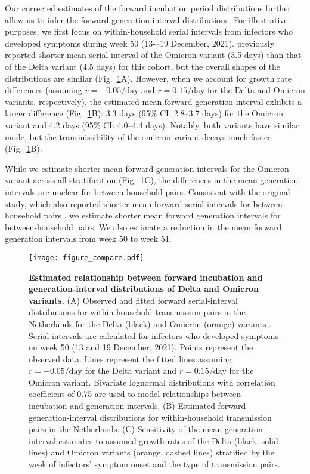 \documentclass[12pt]{article}
\newcommand{\fref}[1]{Fig.~\ref{fig:#1}}
\begin{document}
Our corrected estimates of the forward incubation period distributions further allow us to infer the forward generation-interval distributions.
For illustrative purposes, we first focus on within-household serial intervals from infectors who developed symptoms during week 50 (13-–19 December, 2021).
\citep{backer2021omicron} previously reported shorter mean serial interval of the Omicron variant (3.5 days) than that of the Delta variant (4.5 days) for this cohort, but the overall shapes of the distributions are similar (\fref{serial}A).
However, when we account for growth rate differences (assuming $r=-0.05/\mathrm{day}$ and $r=0.15/\mathrm{day}$ for the Delta and Omicron variants, respectively), the estimated mean forward generation interval exhibits a larger difference (\fref{serial}B): 3.3 days (95\% CI: 2.8--3.7 days) for the Omicron variant and 4.2 days (95\% CI: 4.0--4.4 days).
Notably, both variants have similar mode, but the transmissibility of the omicron variant decays much faster (\fref{serial}B).

While we estimate shorter mean forward generation intervals for the Omicron variant across all stratification (\fref{serial}C), the differences in the mean generation intervals are unclear for between-household pairs.
Consistent with the original study, which also reported shorter mean forward serial intervals for between-household pairs \citep{backer2021omicron}, we estimate shorter mean forward generation intervals for between-household pairs.
We also estimate a reduction in the mean forward generation intervals from week 50 to week 51. 

\begin{figure}[!th]
\texttt{[image: figure\_compare.pdf]}
\caption{
\textbf{Estimated relationship between forward incubation and generation-interval distributions of Delta and Omicron variants.}
(A) Observed and fitted forward serial-interval distributions for within-household transmission pairs in the Netherlands for the Delta (black) and Omicron (orange) variants \citep{backer2021omicron}.
Serial intervals are calculated for infectors who developed symptoms on week 50 (13 and 19 December, 2021).
Points represent the observed data.
Lines represent the fitted lines assuming $r=-0.05/\textrm{day}$ for the Delta variant and $r=0.15/\textrm{day}$ for the Omicron variant. 
Bivariate lognormal distributions with correlation coefficient of 0.75 are used to model relationships between incubation and generation intervals.
(B) Estimated forward generation-interval distributions for within-household transmission pairs in the Netherlands.
(C) Sensitivity of the mean generation-interval estimates to assumed growth rates of the Delta (black, solid lines) and Omicron variants (orange, dashed lines) stratified by the week of infectors' symptom onset and the type of transmission pairs.
\label{fig:serial}
}
\end{figure}
\end{document}
